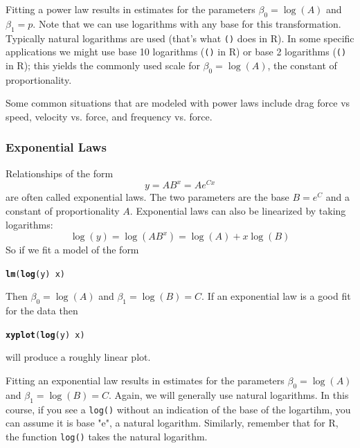\documentclass[twoside]{book}\usepackage[]{graphicx}\usepackage[]{xcolor}
\makeatletter
\newcommand{\hlopt}[1]{\textcolor[rgb]{0,0,0}{#1}}%
\newcommand{\hlstd}[1]{\textcolor[rgb]{0.345,0.345,0.345}{#1}}%
\newcommand{\hlkwd}[1]{\textcolor[rgb]{0.737,0.353,0.396}{\textbf{#1}}}%
\newenvironment{kframe}{%
 \def\at@end@of@kframe{}%
 \ifinner\ifhmode%
  \def\at@end@of@kframe{\end{minipage}}%
  \begin{minipage}{\columnwidth}%
 \fi\fi%
 \def\FrameCommand##1{\hskip\@totalleftmargin \hskip-\fboxsep
 \colorbox{shadecolor}{##1}\hskip-\fboxsep
     \hskip-\linewidth \hskip-\@totalleftmargin \hskip\columnwidth}%
 \MakeFramed {\advance\hsize-\width
   \@totalleftmargin\z@ \linewidth\hsize
   \@setminipage}}%
 {\par\unskip\endMakeFramed%
 \at@end@of@kframe}
\newenvironment{knitrout}{}{} %
\newcommand{\Rindex}[1]{\index{\texttt{#1}}}
\newcommand{\function}[1]{{\color{purple!75!blue}\texttt{\StrSubstitute{#1}{()}{}()}}\Rindex{#1}}
\def\R{{\sf R}}
\makeatother
\begin{document}
Fitting a power law results in estimates for the parameters $\beta_0 = \log(A)$ and $\beta_1 = p$.
Note that we can use logarithms with any base for this transformation.  Typically natural logarithms are used
(that's what \function{log()} does in \R).  
In some specific applications we might use base 10 logarithms (\function{log10()} in \R) 
or base 2 logarithms (\function{log2()} in \R); 
this yields the commonly used scale for 
$\beta_0 = \log(A)$, the constant of proportionality.

Some common situations that are modeled with power laws include drag force vs speed, velocity vs. force, and
frequency vs. force.

\subsubsection{Exponential Laws}

Relationships of the form 
\[ y = A B^x = A e^{Cx} \]
are often called exponential laws.  
The two parameters are the base $B = e^C$ and a constant of proportionality $A$.
Exponential laws can also be linearized by taking logarithms:
\[ \log(y) = \log(A B^x) = \log(A) + x \log(B) \]
So if we fit a model of the form
\begin{knitrout}
\color{fgcolor}\begin{kframe}
\begin{alltt}
\hlkwd{lm}\hlstd{(}\hlkwd{log}\hlstd{(y)} \hlopt{~} \hlstd{x)}
\end{alltt}
\end{kframe}
\end{knitrout}
Then $\beta_0 = \log(A)$ and $\beta_1 = \log(B) = C$.  
If an exponential law is a good fit for the data then
\begin{knitrout}
\color{fgcolor}\begin{kframe}
\begin{alltt}
\hlkwd{xyplot}\hlstd{(}\hlkwd{log}\hlstd{(y)} \hlopt{~} \hlstd{x)}
\end{alltt}
\end{kframe}
\end{knitrout}
will produce a roughly linear plot.

Fitting an exponential law results in estimates for the parameters $\beta_0 = \log(A)$ and $\beta_1 = \log(B) = C$.
Again, we will generally use natural logarithms. In this course, if you see a \texttt{log()} without an indication of the base of the logartihm, you can assume it is base "e", a natural logarithm.  Similarly, remember that for R, the function \texttt{log()} takes the natural logarithm.
\end{document}
